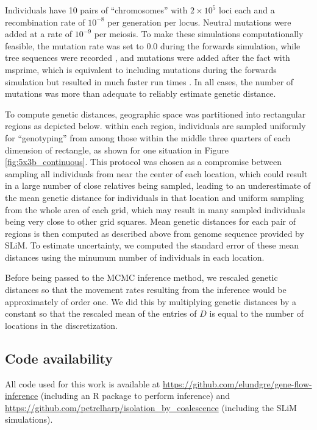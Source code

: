 \documentclass{article}
\begin{document}
Individuals have 10 pairs of ``chromosomes'' with $2 \times 10^5$ loci each 
and a recombination rate of $10^{-8}$ per generation per locus.
Neutral mutations were added at a rate of $10^{-9}$ per meiosis.
To make these simulations computationally feasible,
the mutation rate was set to 0.0 during the forwards simulation,
while tree sequences were recorded \citep{haller2018treesequences},
and mutations were added after the fact with msprime,
which is equivalent to including mutations during the forwards simulation 
but resulted in much faster run times \citep{kelleher2018xxx}.
In all cases, the number of mutations was more than adequate to reliably estimate genetic distance.

To compute genetic distances,
geographic space was partitioned into rectangular regions as depicted below.
within each region, 
individuals are sampled uniformly for ``genotyping'' 
from among those within the middle three quarters of each dimension of rectangle,
as shown for one situation in Figure \ref{fig:5x3b_continuous}.
This protocol was chosen as a compromise between sampling all individuals 
from near the center of each location,
which could result in a large number of close relatives being sampled, 
leading to an underestimate of the mean genetic distance for individuals in that location
and uniform sampling from the whole area of each grid, 
which may result in many sampled individuals being very close to other grid squares.
Mean genetic distances for each pair of regions is then computed as described above
from genome sequence provided by SLiM.
To estimate uncertainty, we computed the standard error of these mean distances
using the minumum number of individuals in each location.

Before being passed to the MCMC inference method,
we rescaled genetic distances so that the movement rates resulting from the inference
would be approximately of order one.
We did this by multiplying genetic distances by a constant
so that the rescaled mean of the entries of $D$
is equal to the number of locations in the discretization. 

\subsection*{Code availability}

All code used for this work is available at \url{https://github.com/elundgre/gene-flow-inference}
(including an R package to perform inference)
and \url{https://github.com/petrelharp/isolation_by_coalescence} (including the SLiM simulations).
\end{document}
